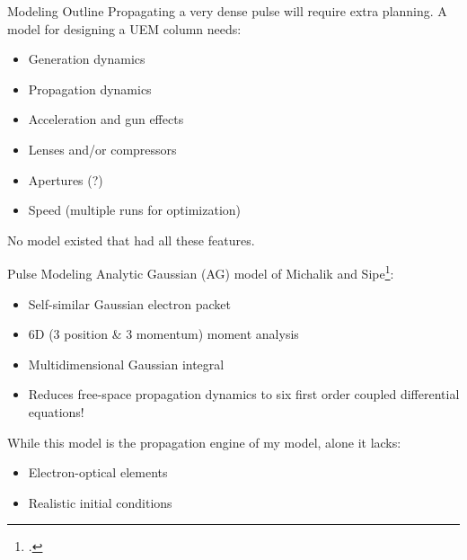 \begin{frame}{Modeling Outline}
Propagating a very dense pulse will require extra planning. A model for designing a UEM column needs:
	\begin{itemize}[<+->]
	    \item Generation dynamics
		\item Propagation dynamics
		\item Acceleration and gun effects
		\item Lenses and/or compressors	
		\item Apertures (?)
		\item Speed (multiple runs for optimization)
	\end{itemize}
No model existed that had all these features.
\end{frame}

\begin{frame}{Pulse Modeling}
	Analytic Gaussian (AG) model of Michalik and Sipe\footcite{michalik_analytic_2006}: 
	\begin{itemize}
		\item<2-> Self-similar Gaussian electron packet
		\item<3-> 6D (3 position \& 3 momentum) moment analysis
		\item<4-> Multidimensional Gaussian integral
		\item<5->[$\Rightarrow$] Reduces free-space propagation dynamics to six first order coupled differential equations!
	\end{itemize}
    While this model is the propagation engine of my model, alone it lacks:
    \begin{itemize}
      \item<6-> Electron-optical elements
      \item<7-> Realistic initial conditions
    \end{itemize}
\end{frame}

